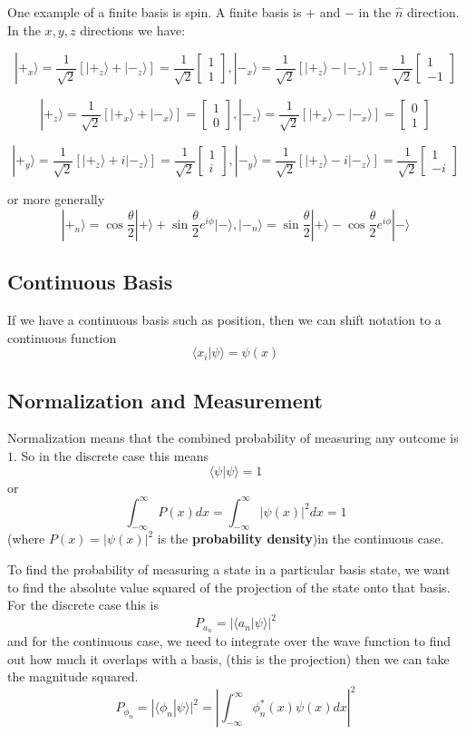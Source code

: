 \documentclass{homework}
\newcommand{\m}[1]{\begin{bmatrix} #1 \end{bmatrix}}
\newcommand{\kt}{\rangle}
\newcommand{\ket}[1]{| #1 \rangle}
\newcommand{\bra}[1]{ \langle #1 |}
\begin{document}
One example of a finite basis is spin. A finite basis is $+$ and $-$ in the $\hat{n}$ direction. In the $x,y,z$ directions we have:

\[| +_x \kt = \frac{1}{\sqrt{2}}[|+_z \kt + |-_z \kt] = \frac{1}{\sqrt{2}} \m{ 1\\ 1},   | -_x \kt = \frac{1}{\sqrt{2}}[|+_z \kt - |-_z \kt]= \frac{1}{\sqrt{2}} \m{ 1\\ -1}\]


\[| +_z \kt = \frac{1}{\sqrt{2}}[|+_x \kt + |-_x \kt] =  \m{ 1\\ 0},  | -_z \kt = \frac{1}{\sqrt{2}}[|+_x \kt - |-_x \kt] = \m{ 0\\ 1}\]

\[| +_y \kt = \frac{1}{\sqrt{2}}[|+_z \kt + i|-_z \kt] = \frac{1}{\sqrt{2}} \m{ 1\\ i}, | -_y \kt = \frac{1}{\sqrt{2}}[|+_z  \kt - i|-_z \kt] = \frac{1}{\sqrt{2}} \m{ 1\\ -i}\]

or more generally
\[\ket{+_n} = \cos \frac{\theta}{2}\ket{+} + \sin \frac{\theta}{2}e^{i\phi}\ket{-}, \ket{-_n} = \sin \frac{\theta}{2}\ket{+} - \cos \frac{\theta}{2}e^{i\phi}\ket{-}\]


\subsection{Continuous Basis}

If we have a continuous basis such as position, then we can shift notation to a continuous function 
\[\bra{x_i}\psi \kt = \psi(x)\]


\subsection{Normalization and Measurement}

Normalization means that the combined probability of measuring any outcome is $1$. So in the discrete case this means 
\[\bra{\psi}\psi \kt = 1\]
or
\[\int_{-\infty}^{\infty}P(x)dx = \int_{-\infty}^{\infty}|\psi(x)|^2dx = 1\]
(where $P(x) = |\psi(x)|^2$ is the \textbf{probability density})in the continuous case.

To find the probability of measuring a state in a particular basis state, we want to find the absolute value squared of the projection of the state onto that basis. For the discrete case this is
\[P_{a_n} = |\bra{a_n}\psi \kt|^2\]
and for the continuous case, we need to integrate over the wave function to find out how much it overlaps with a basis, (this is the projection) then we can take the magnitude squared.
\[P_{\phi_n} = |\bra{\phi_n}\psi \kt|^2 = \left|\int_{-\infty}^{\infty} \phi_n^*(x)\psi(x)dx\right|^2\]
\end{document}
